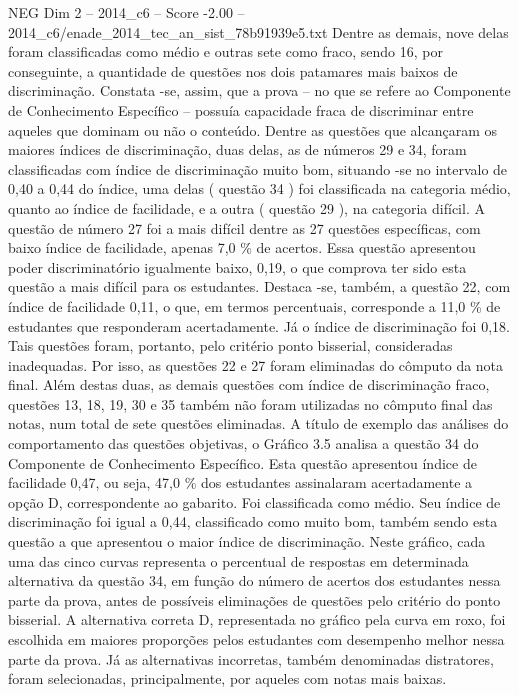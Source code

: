 \begin{textsample}{NEG Dim 2 – 2014\_c6 – Score -2.00 – 2014\_c6/enade\_2014\_tec\_an\_sist\_78b91939e5.txt}
Dentre as demais, nove delas foram classificadas como médio e outras sete como fraco, sendo 16, por conseguinte, a quantidade de questões nos dois patamares mais baixos de discriminação.
Constata -se, assim, que a prova – no que se refere ao Componente de Conhecimento Específico – possuía capacidade fraca de discriminar entre aqueles que dominam ou não o conteúdo.
Dentre as questões que alcançaram os maiores índices de discriminação, duas delas, as de números 29 e 34, foram classificadas com índice de discriminação muito bom, situando -se no intervalo de 0,40 a 0,44 do índice, uma delas ( questão 34 ) foi classificada na categoria médio, quanto ao índice de facilidade, e a outra ( questão 29 ), na categoria difícil.
A questão de número 27 foi a mais difícil dentre as 27 questões específicas, com baixo índice de facilidade, apenas 7,0 \% de acertos.
Essa questão apresentou poder discriminatório igualmente baixo, 0,19, o que comprova ter sido esta questão a mais difícil para os estudantes.
Destaca -se, também, a questão 22, com índice de facilidade 0,11, o que, em termos percentuais, corresponde a 11,0 \% de estudantes que responderam acertadamente.
Já o índice de discriminação foi 0,18.
Tais questões foram, portanto, pelo critério ponto bisserial, consideradas inadequadas.
Por isso, as questões 22 e 27 foram eliminadas do cômputo da nota final.
Além destas duas, as demais questões com índice de discriminação fraco, questões 13, 18, 19, 30 e 35 também não foram utilizadas no cômputo final das notas, num total de sete questões eliminadas.
A título de exemplo das análises do comportamento das questões objetivas, o Gráfico 3.5 analisa a questão 34 do Componente de Conhecimento Específico.
Esta questão apresentou índice de facilidade 0,47, ou seja, 47,0 \% dos estudantes assinalaram acertadamente a opção D, correspondente ao gabarito.
Foi classificada como médio.
Seu índice de discriminação foi igual a 0,44, classificado como muito bom, também sendo esta questão a que apresentou o maior índice de discriminação.
Neste gráfico, cada uma das cinco curvas representa o percentual de respostas em determinada alternativa da questão 34, em função do número de acertos dos estudantes nessa parte da prova, antes de possíveis eliminações de questões pelo critério do ponto bisserial.
A alternativa correta D, representada no gráfico pela curva em roxo, foi escolhida em maiores proporções pelos estudantes com desempenho melhor nessa parte da prova.
Já as alternativas incorretas, também denominadas distratores, foram selecionadas, principalmente, por aqueles com notas mais baixas.

\end{textsample}
